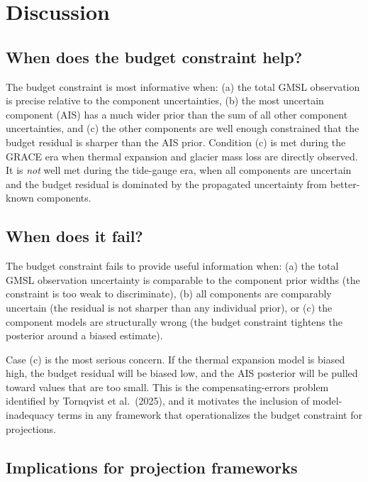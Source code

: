 \documentclass[11pt]{article}
\begin{document}
\section{Discussion}
\label{sec:discussion}

\subsection{When does the budget constraint help?}

The budget constraint is most informative when: (a) the total GMSL observation is precise relative to the component uncertainties, (b) the most uncertain component (AIS) has a much wider prior than the sum of all other component uncertainties, and (c) the other components are well enough constrained that the budget residual is sharper than the AIS prior.  Condition (c) is met during the GRACE era when thermal expansion and glacier mass loss are directly observed.  It is \emph{not} well met during the tide-gauge era, when all components are uncertain and the budget residual is dominated by the propagated uncertainty from better-known components.

\subsection{When does it fail?}

The budget constraint fails to provide useful information when: (a) the total GMSL observation uncertainty is comparable to the component prior widths (the constraint is too weak to discriminate), (b) all components are comparably uncertain (the residual is not sharper than any individual prior), or (c) the component models are structurally wrong (the budget constraint tightens the posterior around a biased estimate).

Case (c) is the most serious concern.  If the thermal expansion model is biased high, the budget residual will be biased low, and the AIS posterior will be pulled toward values that are too small.  This is the compensating-errors problem identified by Tornqvist et al.\ (2025), and it motivates the inclusion of model-inadequacy terms in any framework that operationalizes the budget constraint for projections.

\subsection{Implications for projection frameworks}
\end{document}
